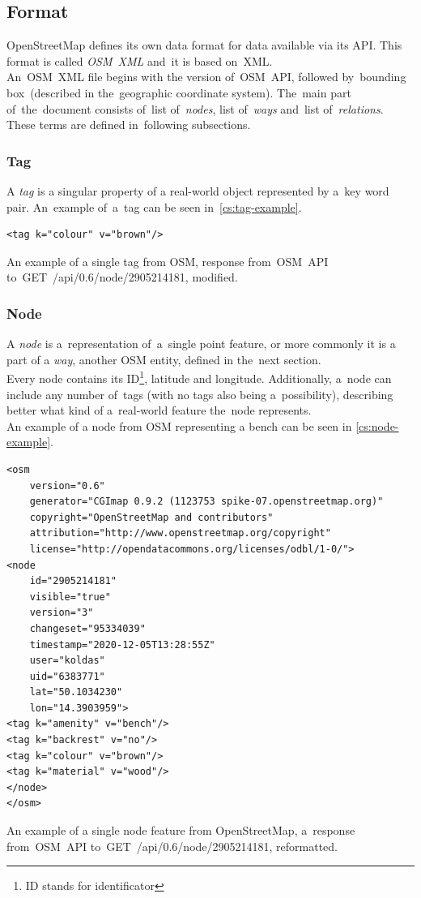 \subsection{Format}
OpenStreetMap defines its own data format for data available via its API. This format is called \textit{OSM~XML} and~it is based on~XML.\\
An~OSM~XML file begins with the version of~OSM~API, followed by~bounding box~(described in the~geographic coordinate system). The~main part of~the~document consists of~list of~\textit{nodes}, list of~\textit{ways} and~list of~\textit{relations}. These terms are defined in~following subsections.
\subsubsection{Tag}
A \textit{tag} is a singular property of a real-world object represented by a~key word pair.
An~example of~a~tag can be seen in~\autoref{cs:tag-example}.
\begin{listing}[ht!]
\begin{verbatim}
<tag k="colour" v="brown"/>
\end{verbatim}
\caption[An example of a single tag from OSM]{An example of a single tag from OSM, response from~OSM~API to~GET~/api/0.6/node/2905214181, modified.}
\label{cs:tag-example}
\end{listing}
\subsubsection{Node}
A \textit{node} is a~representation of~a~single point feature, or more commonly it is a part of a \textit{way}, another OSM entity, defined in the~next section. \\
Every node contains its ID\footnote{ID stands for identificator}, latitude and longitude. Additionally, a~node can include any number of~tags (with no tags also being a~possibility), describing better what kind of a~real-world feature the~node represents. \\ 
An example of a node from OSM representing a bench can be seen in \autoref{cs:node-example}.
\begin{listing}[ht!]
\begin{verbatim}
<osm 
    version="0.6" 
    generator="CGImap 0.9.2 (1123753 spike-07.openstreetmap.org)"
    copyright="OpenStreetMap and contributors"
    attribution="http://www.openstreetmap.org/copyright" 
    license="http://opendatacommons.org/licenses/odbl/1-0/">
<node
    id="2905214181"
    visible="true"
    version="3"
    changeset="95334039"
    timestamp="2020-12-05T13:28:55Z"
    user="koldas"
    uid="6383771"
    lat="50.1034230"
    lon="14.3903959">
<tag k="amenity" v="bench"/>
<tag k="backrest" v="no"/>
<tag k="colour" v="brown"/>
<tag k="material" v="wood"/>
</node>
</osm>    
\end{verbatim}
\caption[An example of a single node feature from OpenStreetMap]{An example of a single node feature from OpenStreetMap, a~response from~OSM~API to~GET~/api/0.6/node/2905214181, reformatted.}
\label{cs:node-example}
\end{listing}
